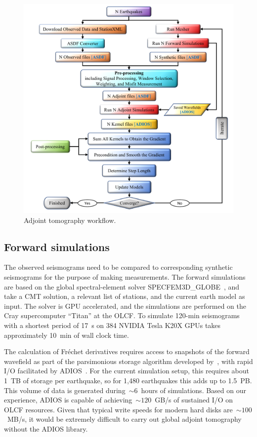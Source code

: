 \begin{figure}
  \centering
  \includegraphics[width=\textwidth]{ch-GLADM25/figures/adjoint_workflow_6.pdf}
  \caption[Adjoint tomography workflow]{\small{Adjoint tomography workflow.}}
  \label{fig:adjoint_workflow}
\end{figure}

\subsection{Forward simulations}

The observed seismograms need to be compared to corresponding synthetic seismograms
for the purpose of making measurements.
The forward simulations are based on the global spectral-element solver
SPECFEM3D\_GLOBE~\cite{KoTr02a,KoTr02a}, and take a CMT solution, a relevant list
of stations, and the current earth model as input.
The solver is GPU accelerated, and the simulations are performed on the Cray supercomputer ``Titan''
at the OLCF.
To simulate 120-min seismograms with a shortest period of 17~s on 384 NVIDIA
Tesla K20X GPUs takes approximately 10~min of wall clock time.

The calculation of Fr\'echet derivatives requires
access to snapshots of the forward wavefield as part of the parsimonious storage
algorithm developed by~\cite{KoXiBoPeSaLiTr16},
with rapid I/O facilitated by ADIOS~\cite{liu2014hello}.
For the current simulation setup,
this requires about 1~TB of storage per earthquake,
so for 1,480 earthquakes this adds up to 1.5~PB.
This volume of data is generated during~$\sim6$~hours of simulations.
Based on our experience, ADIOS is capable of achieving~$\sim120$~GB/s
of sustained I/O on OLCF resources.
Given that typical write speeds for modern hard disks are~$\sim100$~MB/s,
it would be extremely difficult to carry out global adjoint tomography without the ADIOS library.

